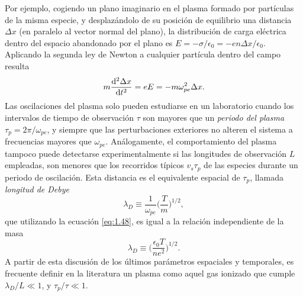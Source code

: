 Por ejemplo, cogiendo un plano imaginario en el plasma formado por partículas de la misma especie, y desplazándolo de su posición de equilibrio una distancia $\Delta x$ (en paralelo al vector normal del plano), la distribución de carga eléctrica dentro del espacio abandonado por el plano es $E = - \sigma/\epsilon_{0} = -en \Delta x/\epsilon_{0}$. Aplicando la segunda ley de Newton a cualquier partícula dentro del campo resulta
\begin{equation}\label{eq:1.49}
  m \frac{\operatorname{d^{2}}\!\Delta x}{\operatorname{d}\!{t}^{2}} = eE = -m \omega^{2}_{pe} \Delta x.
\end{equation}
Las oscilaciones del plasma solo pueden estudiarse en un laboratorio cuando los intervalos de tiempo de observación $\tau$ son mayores que un \emph{periodo del plasma} $\tau_{p}=2 \pi/\omega_{pe}$, y siempre que las perturbaciones exteriores no alteren el sistema a frecuencias mayores que $\omega_{pe}$. Análogamente, el comportamiento del plasma tampoco puede detectarse experimentalmente si las longitudes de observación $L$ empleadas, son menores que los recorridos típicos $v_{s} \tau_{p}$ de las especies durante un periodo de oscilación. Esta distancia es el equivalente espacial de $\tau_{p}$, llamada \emph{longitud de Debye}
\begin{equation}\label{eq:1.50}
  \lambda_{D} \equiv \frac{1}{\omega_{pe}}\bigg(\frac{T}{m}\bigg)^{1/2},
\end{equation}
que utilizando la ecuación \eqref{eq:1.48}, es igual a la relación independiente de la masa
\begin{equation}\label{eq:1.51}
  \lambda_{D} \equiv \bigg(\frac{\epsilon_{0}T}{ne^{2}}\bigg)^{1/2}.
\end{equation}
A partir de esta discusión de los últimos parámetros espaciales y temporales, es frecuente definir en la literatura \autocite{Fitzpatrick2022} un plasma como aquel gas ionizado que cumple $\lambda_{D}/L \ll 1$, y $\tau_{p}/\tau \ll 1$. 

